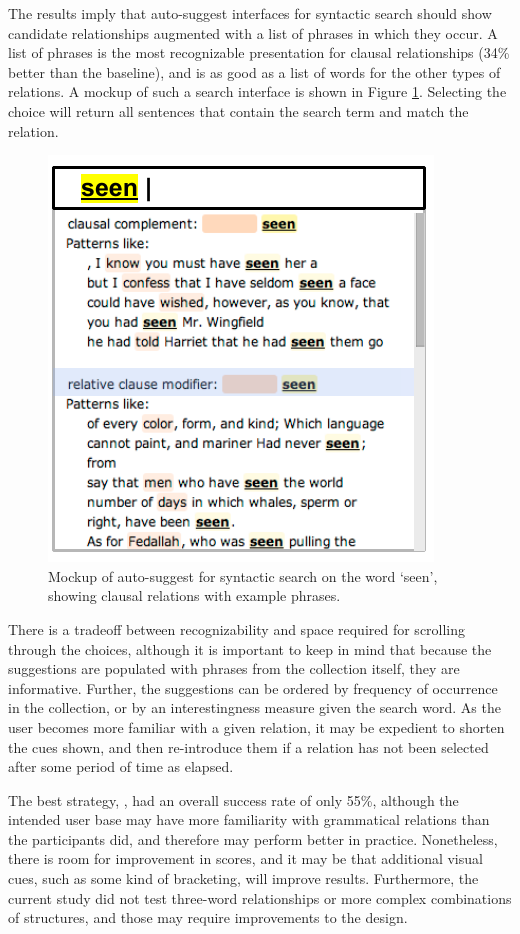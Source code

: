 

The results imply that auto-suggest interfaces for syntactic search should show candidate relationships augmented with a list of phrases in which they occur. A list of phrases is the most recognizable presentation for clausal relationships (34\% better than the baseline), and is as good as a list of words for the other types of relations. A mockup of such a search interface is shown in Figure \ref{fig:phrases-mockup}.  Selecting the choice will return all sentences that contain the search term and match the relation.
\begin{figure}
\centering
\includegraphics[width=0.5\columnwidth]{fig/phrases-mockup}
\caption{
	\label{fig:phrases-mockup} Mockup of auto-suggest for syntactic search on the word `seen', showing clausal relations with example phrases.
}
\end{figure}

There is a tradeoff between recognizability and space required for scrolling through the choices, although it is important to keep in mind that because the suggestions are populated with phrases from the collection itself, they are informative.    Further, the suggestions can be ordered by frequency of occurrence in the collection, or by an interestingness measure given the search word.  As the user becomes more familiar with a given relation, it may  be expedient to shorten the cues shown, and then re-introduce them if a relation has not been selected after some period of time as elapsed.

The best  strategy, , had an overall success rate of only 55\%, although the intended user base may have more familiarity with grammatical relations than the participants did, and therefore may perform better in practice.  Nonetheless, there is room for improvement in scores, and it may be that additional visual cues, such as some kind of bracketing, will improve results.  Furthermore, the current study did not test three-word relationships or more complex combinations of structures, and those may require improvements to the design.
